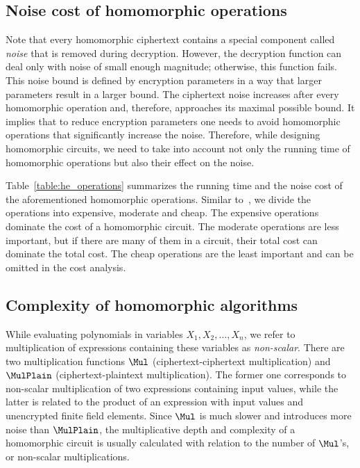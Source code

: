 \subsection{Noise cost of homomorphic operations}\label{subsec:cost}
Note that every homomorphic ciphertext contains a special component called \emph{noise} that is removed during decryption.
However, the decryption function can deal only with noise of small enough magnitude; otherwise, this function fails.
This noise bound is defined by encryption parameters in a way that larger parameters result in a larger bound.
The ciphertext noise increases after every homomorphic operation and, therefore, approaches its maximal possible bound.
It implies that to reduce encryption parameters one needs to avoid homomorphic operations that significantly increase the noise.
Therefore, while designing homomorphic circuits, we need to take into account not only the running time of homomorphic operations but also their effect on the noise.  

Table~\ref{table:he_operations} summarizes the running time and the noise cost of the aforementioned homomorphic operations.
Similar to~\cite{C:HalSho14}, we divide the operations into expensive, moderate and cheap.
The expensive operations dominate the cost of a homomorphic circuit.
The moderate operations are less important, but if there are many of them in a circuit, their total cost can dominate the total cost.
The cheap operations are the least important and can be omitted in the cost analysis.

\subsection{Complexity of homomorphic algorithms}
While evaluating polynomials in variables $X_1, X_2, \dots, X_n$, we refer to multiplication of expressions containing these variables as \emph{non-scalar}.
There are two multiplication functions $\Mul$ (ciphertext-ciphertext multiplication) and $\MulPlain$ (ciphertext-plaintext multiplication).
The former one corresponds to non-scalar multiplication of two expressions containing input values, while the latter is related to the product of an expression with input values and unencrypted finite field elements. 
Since $\Mul$ is much slower and introduces more noise than $\MulPlain$, the multiplicative depth and complexity of a homomorphic circuit is usually calculated with relation to the number of $\Mul$'s, or non-scalar multiplications.


